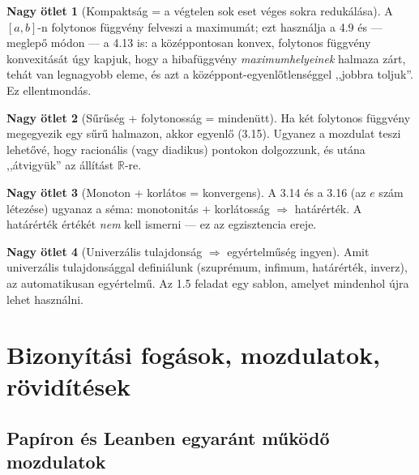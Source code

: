 \documentclass[11pt,a4paper]{article}
\newcommand{\R}{\mathbb{R}}
\theoremstyle{definition}
\newtheorem{bigidea}{Nagy ötlet}
\begin{document}
\begin{bigidea}[Kompaktság = a végtelen sok eset véges sokra redukálása]
A $[a,b]$-n folytonos függvény felveszi a maximumát; ezt használja a 4.9 és
--- meglepő módon --- a 4.13 is: a középpontosan konvex, folytonos függvény
konvexitását úgy kapjuk, hogy a hibafüggvény \emph{maximumhelyeinek} halmaza
zárt, tehát van legnagyobb eleme, és azt a középpont-egyenlőtlenséggel
,,jobbra toljuk''. Ez ellentmondás.
\end{bigidea}

\begin{bigidea}[Sűrűség + folytonosság = mindenütt]
Ha két folytonos függvény megegyezik egy sűrű halmazon, akkor egyenlő
(3.15). Ugyanez a mozdulat teszi lehetővé, hogy racionális (vagy diadikus)
pontokon dolgozzunk, és utána ,,átvigyük'' az állítást $\R$-re.
\end{bigidea}

\begin{bigidea}[Monoton + korlátos = konvergens]
A 3.14 és a 3.16 (az $e$ szám létezése) ugyanaz a séma: monotonitás $+$
korlátosság $\Rightarrow$ határérték. A határérték értékét \emph{nem}
kell ismerni --- ez az egzisztencia ereje.
\end{bigidea}

\begin{bigidea}[Univerzális tulajdonság $\Rightarrow$ egyértelműség ingyen]
Amit univerzális tulajdonsággal definiálunk (szuprémum, infimum, határérték,
inverz), az automatikusan egyértelmű. Az 1.5 feladat egy sablon, amelyet
mindenhol újra lehet használni.
\end{bigidea}

\section{Bizonyítási fogások, mozdulatok, rövidítések}

\subsection{Papíron és Leanben egyaránt működő mozdulatok}
\end{document}
